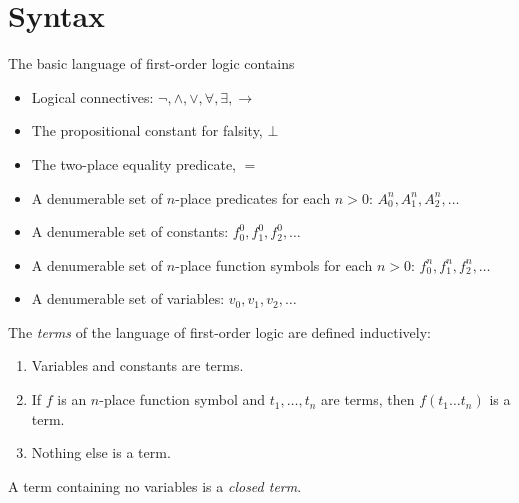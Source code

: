 \documentclass[syntax-and-semantics]{subfiles}
\begin{document}
\section{Syntax}


The basic language of first-order logic contains

\begin{itemize}
\item Logical connectives: $\lnot, \land, \lor, \forall, \exists, \rightarrow$
\item The propositional constant for falsity, $\bot$
\item The two-place equality predicate, $=$
\item A denumerable set of $n$-place predicates for each $n>0$: $A^n_0, A^n_1, A^n_2,\ldots$
\item A denumerable set of constants: $f^0_0, f^0_1, f^0_2,\ldots$
\item A denumerable set of $n$-place function symbols for each $n>0$: $f^n_0, f^n_1, f^n_2,\ldots$
\item A denumerable set of variables: $v_0, v_1, v_2,\ldots$
\end{itemize}


\begin{defn}[Term]
The \emph{terms} of the language of first-order logic are defined inductively:
\begin{enumerate}
\item Variables and constants are terms.
\item If $f$ is an $n$-place function symbol and $t_1,\ldots,t_n$ are terms, then $f(t_1 \ldots t_n)$ is a term.
\item Nothing else is a term.
\end{enumerate}
A term containing no variables is a \emph{closed term}.
\end{defn}
\end{document}
